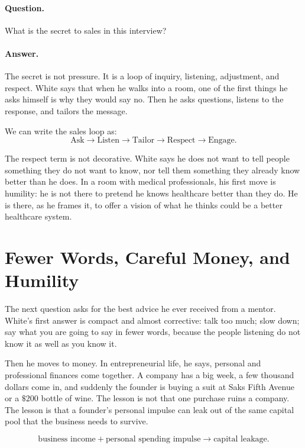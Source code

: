 \paragraph{Question.} What is the secret to sales in this interview?

\paragraph{Answer.} The secret is not pressure. It is a loop of inquiry, listening, adjustment, and respect. White says that when he walks into a room, one of the first things he asks himself is why they would say no. Then he asks questions, listens to the response, and tailors the message.

We can write the sales loop as:
\begin{equation}
\text{Ask}
\longrightarrow
\text{Listen}
\longrightarrow
\text{Tailor}
\longrightarrow
\text{Respect}
\longrightarrow
\text{Engage}.
\end{equation}

The respect term is not decorative. White says he does not want to tell people something they do not want to know, nor tell them something they already know better than he does. In a room with medical professionals, his first move is humility: he is not there to pretend he knows healthcare better than they do. He is there, as he frames it, to offer a vision of what he thinks could be a better healthcare system.

\section{Fewer Words, Careful Money, and Humility}

The next question asks for the best advice he ever received from a mentor. White's first answer is compact and almost corrective: talk too much; slow down; say what you are going to say in fewer words, because the people listening do not know it as well as you know it.

Then he moves to money. In entrepreneurial life, he says, personal and professional finances come together. A company has a big week, a few thousand dollars come in, and suddenly the founder is buying a suit at Saks Fifth Avenue or a \(\$200\) bottle of wine. The lesson is not that one purchase ruins a company. The lesson is that a founder's personal impulse can leak out of the same capital pool that the business needs to survive.

\begin{equation}
\text{business income}
+
\text{personal spending impulse}
\longrightarrow
\text{capital leakage}.
\end{equation}

